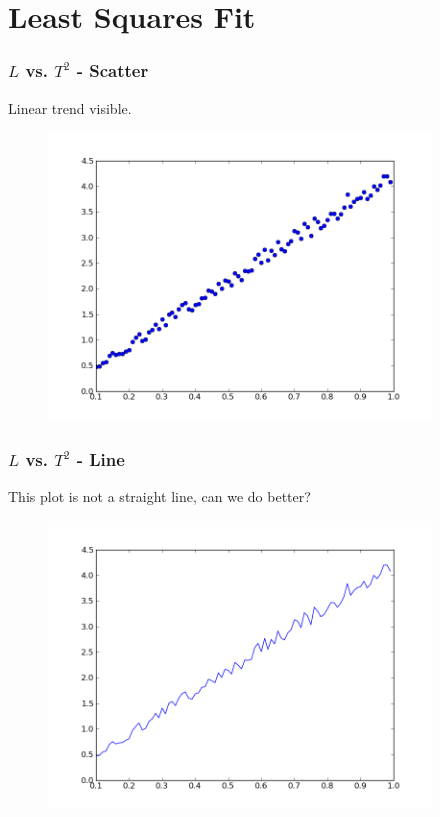 \documentclass[14pt,compress]{beamer}
\begin{document}
\section{Least Squares Fit}
\begin{frame}[fragile]
\frametitle{$L$ vs. $T^2$ - Scatter}
Linear trend visible.
\vspace{-0.1in}
\begin{figure}
\includegraphics[width=4in]{data/L-Tsq-points}
\end{figure}
\end{frame}

\begin{frame}[fragile]
\frametitle{$L$ vs. $T^2$ - Line}
This plot is not a straight line, can we do better?
\vspace{-0.1in}
\begin{figure}
\includegraphics[width=4in]{data/L-Tsq-Line}
\end{figure}
\end{frame}
\end{document}
